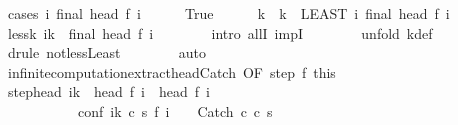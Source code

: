 \begin{isabellebody}
\ {\isacharparenleft}cases\ {\isachardoublequoteopen}{\isasymexists}i{\isachardot}\ final\ {\isacharparenleft}head\ {\isacharparenleft}f\ i{\isacharparenright}{\isacharparenright}{\isachardoublequoteclose}{\isacharparenright}\isanewline
\ \ \ \ \isamarkupfalse%
\ True\isanewline
\ \ \ \ \isamarkupfalse%
\ k\ \ {\isachardoublequoteopen}k\ {\isacharequal}\ {\isacharparenleft}LEAST\ i{\isachardot}\ final\ {\isacharparenleft}head\ {\isacharparenleft}f\ i{\isacharparenright}{\isacharparenright}{\isacharparenright}{\isachardoublequoteclose}\isanewline
\ \ \ \ \isamarkupfalse%
\ less{\isacharunderscore}k{\isacharcolon}\ {\isachardoublequoteopen}{\isasymforall}i{\isacharless}k{\isachardot}\ {\isasymnot}\ final\ {\isacharparenleft}head\ {\isacharparenleft}f\ i{\isacharparenright}{\isacharparenright}{\isachardoublequoteclose}\isanewline
\ \ \ \ \ \ \isamarkupfalse%
\ {\isacharparenleft}intro\ allI\ impI{\isacharparenright}\isanewline
\ \ \ \ \ \ \isamarkupfalse%
\ {\isacharparenleft}unfold\ k{\isacharunderscore}def{\isacharparenright}\isanewline
\ \ \ \ \ \ \isamarkupfalse%
\ {\isacharparenleft}drule\ not{\isacharunderscore}less{\isacharunderscore}Least{\isacharparenright}\isanewline
\ \ \ \ \ \ \isamarkupfalse%
\ auto\isanewline
\ \ \ \ \ \ \isamarkupfalse%
\isanewline
\ \ \ \ \isamarkupfalse%
\ infinite{\isacharunderscore}computation{\isacharunderscore}extract{\isacharunderscore}head{\isacharunderscore}Catch\ {\isacharbrackleft}OF\ step\ f{\isacharunderscore}{}\ this{\isacharbrackright}\isanewline
\ \ \ \ \isamarkupfalse%
\ step{\isacharunderscore}head{\isacharcolon}\ {\isachardoublequoteopen}{\isasymforall}i{\isacharless}k{\isachardot}\ {\isasymGamma}{\isasymturnstile}\ head\ {\isacharparenleft}f\ i{\isacharparenright}\ {\isasymrightarrow}\ head\ {\isacharparenleft}f\ {\isacharparenleft}i\ {\isacharplus}\ {}{\isacharparenright}{\isacharparenright}{\isachardoublequoteclose}\ \isanewline
\ \ \ \ \ \ \ \ \ \ \ conf{\isacharcolon}\ {\isachardoublequoteopen}{\isasymforall}i{\isacharless}k{\isachardot}\ {\isacharparenleft}{\isasymexists}c{\isacharprime}\ s{\isacharprime}{\isachardot}\ f\ {\isacharparenleft}i\ {\isacharplus}\ {}{\isacharparenright}\ {\isacharequal}\ {\isacharparenleft}Catch\ c{\isacharprime}\ c\ s{\isacharprime}{\isacharparenright}{\isacharparenright}{\isachardoublequoteclose}\isanewline

\end{isabellebody}
